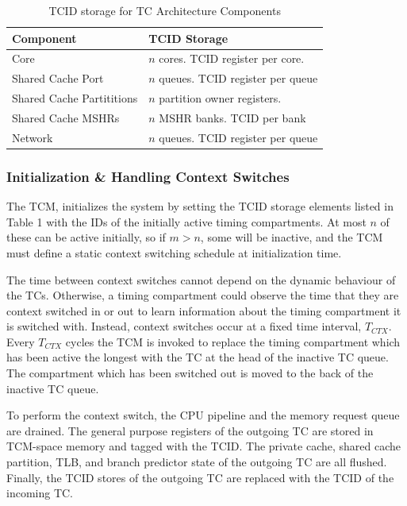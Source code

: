 \begin{table}
    \begin{footnotesize}
\begin{tabular}{l|l}
    \hline
    Component & TCID Storage \\
    \hline
    Core & $n$ cores. TCID register per core. \\
    Shared Cache Port & $n$ queues. TCID register per queue \\
    Shared Cache Partititions & $n$ partition owner registers. \\
    Shared Cache MSHRs & $n$ MSHR banks. TCID per bank \\
    Network & $n$ queues. TCID register per queue\\
    \hline
\end{tabular}
    \end{footnotesize}
    \caption{TCID storage for TC Architecture Components}
    \label{table:tcid}
\end{table}

\subsubsection{Initialization \& Handling Context Switches}
The TCM, initializes the system by setting the TCID storage elements listed in 
Table 1 with the IDs of the initially active timing compartments. At most $n$ 
of these can be active initially, so if $m>n$, some will be inactive, and the 
TCM must define a static context switching schedule at initialization time.

The time between context switches cannot depend on the dynamic behaviour of the 
TCs. Otherwise, a timing compartment could observe the time that they are 
context switched in or out to learn information about the timing compartment it 
is switched with. Instead, context switches occur at a fixed time interval, 
$T_{CTX}$. Every $T_{CTX}$ cycles the TCM is invoked to replace the timing 
compartment which has been active the longest with the TC at the head of the 
inactive TC queue. The compartment which has been switched out is moved to the 
back of the inactive TC queue.

To perform the context switch, the CPU pipeline and the memory request queue 
are drained. The general purpose registers of the outgoing TC are stored in 
TCM-space memory and tagged with the TCID. The private cache, shared cache 
partition, TLB, and branch predictor state of the outgoing TC are all flushed.  
Finally, the TCID stores of the outgoing TC are replaced with the TCID of the 
incoming TC. 

